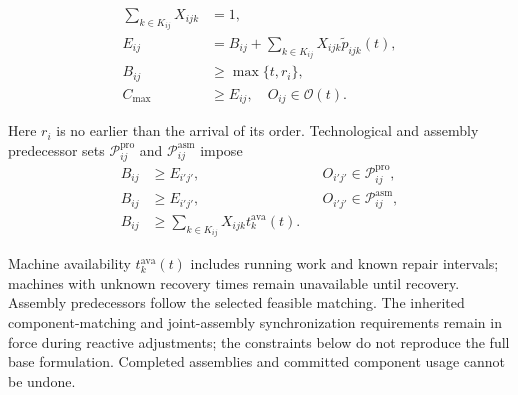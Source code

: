 \begin{equation}
 \begin{aligned}
 \sum_{k\in K_{ij}}X_{ijk}&=1, \\
 E_{ij}&=B_{ij}+\sum_{k\in K_{ij}}X_{ijk}\widetilde p_{ijk}(t),
 \\
 B_{ij}&\ge\max\{t,r_i\}, \\
 C_{\max}&\ge E_{ij},\quad O_{ij}\in\mathcal O(t).
 \end{aligned}
 \label{eq:execution_constraints}
\end{equation}


Here $r_i$ is no earlier than the arrival of its order. Technological and assembly predecessor sets
$\mathcal P^{\mathrm{pro}}_{ij}$ and $\mathcal P^{\mathrm{asm}}_{ij}$ impose
\begin{equation}
 \begin{aligned}
 B_{ij}&\ge E_{i'j'}, &&O_{i'j'}\in\mathcal P^{\mathrm{pro}}_{ij},
 \\
 B_{ij}&\ge E_{i'j'}, &&O_{i'j'}\in\mathcal P^{\mathrm{asm}}_{ij},
 \\
 B_{ij}&\ge\sum_{k\in K_{ij}}X_{ijk}t_k^{\mathrm{ava}}(t).
 \end{aligned}
 \label{eq:precedence_constraints}
\end{equation}


Machine availability $t_k^{\mathrm{ava}}(t)$ includes running work and known repair intervals;
machines with unknown recovery times remain unavailable until recovery. Assembly predecessors follow the selected feasible matching. The inherited component-matching
and joint-assembly synchronization requirements remain in force during reactive adjustments;
the constraints below do not reproduce the full base formulation. Completed assemblies and
committed component usage cannot be undone.





